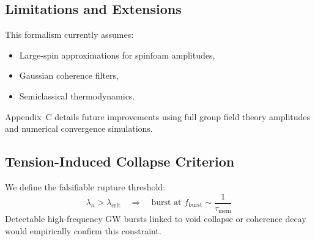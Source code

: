 \subsection{Limitations and Extensions}

This formalism currently assumes:
\begin{itemize}
    \item Large-spin approximations for spinfoam amplitudes,
    \item Gaussian coherence filters,
    \item Semiclassical thermodynamics.
\end{itemize}
Appendix~C details future improvements using full group field theory amplitudes and numerical convergence simulations.

\subsection{Tension-Induced Collapse Criterion}

We define the falsifiable rupture threshold:
\begin{equation}
\lambda_n > \lambda_{\text{crit}} \quad \Rightarrow \quad \text{burst at } f_{\text{burst}} \sim \frac{1}{\tau_{\text{mem}}}
\end{equation}
Detectable high-frequency GW bursts linked to void collapse or coherence decay would empirically confirm this constraint.

